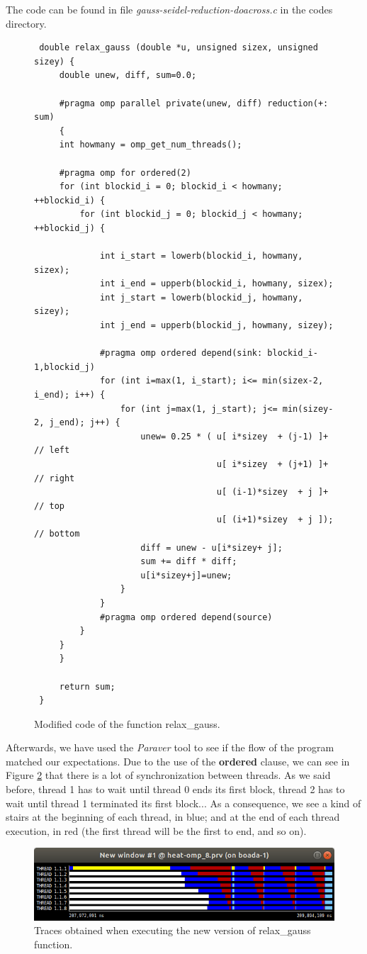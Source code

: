 \documentclass[12pt, a4paper]{article}
\begin{document}
The code can be found in file \textit{gauss-seidel-reduction-doacross.c} in the codes directory.

\begin{figure}[H]
\begin{lstlisting}
 double relax_gauss (double *u, unsigned sizex, unsigned sizey) {
     double unew, diff, sum=0.0;
 
     #pragma omp parallel private(unew, diff) reduction(+: sum)
     {
	 int howmany = omp_get_num_threads();
	
	 #pragma omp for ordered(2) 
	 for (int blockid_i = 0; blockid_i < howmany; ++blockid_i) {
		 for (int blockid_j = 0; blockid_j < howmany; ++blockid_j) {
			 
			 int i_start = lowerb(blockid_i, howmany, sizex);
			 int i_end = upperb(blockid_i, howmany, sizex);
			 int j_start = lowerb(blockid_j, howmany, sizey);
			 int j_end = upperb(blockid_j, howmany, sizey);
			
			 #pragma omp ordered depend(sink: blockid_i-1,blockid_j)
			 for (int i=max(1, i_start); i<= min(sizex-2, i_end); i++) {
				 for (int j=max(1, j_start); j<= min(sizey-2, j_end); j++) {
					 unew= 0.25 * ( u[ i*sizey	+ (j-1) ]+  // left
								    u[ i*sizey	+ (j+1) ]+  // right
								    u[ (i-1)*sizey	+ j ]+  // top
								    u[ (i+1)*sizey	+ j ]); // bottom
					 diff = unew - u[i*sizey+ j];
					 sum += diff * diff; 
					 u[i*sizey+j]=unew;
				 }
			 }
			 #pragma omp ordered depend(source)
		 }
	 }
	 }
 
     return sum;
 }
\end{lstlisting}
\caption{Modified code of the function relax\_gauss.}
\label{code:chosenone}
\end{figure}
 
Afterwards, we have used the \textit{Paraver} tool to see if the flow of the program matched our expectations. Due to the use of the \textbf{ordered} clause, we can see in Figure \ref{fig:trace-gauss-seidel-S4} that there is a lot of synchronization between threads. As we said before, thread 1 has to wait until thread 0 ends its first block, thread 2 has to wait until thread 1 terminated its first block... As a consequence, we see a kind of stairs at the beginning of each thread, in blue; and at the end of each thread execution, in red (the first thread will be the first to end, and so on).

\begin{figure}[H]
	\centering
	\includegraphics[scale=0.5]{./images/paraver-gauss}
	\caption{Traces obtained when executing the new version of relax\_gauss function.}
	\label{fig:trace-gauss-seidel-S4}
\end{figure}
\end{document}
